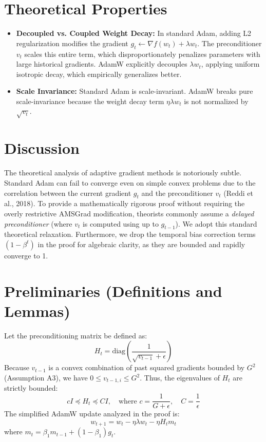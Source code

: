 \documentclass[11pt]{article}
\begin{document}
\section*{Theoretical Properties}
\begin{itemize}
    \item \textbf{Decoupled vs. Coupled Weight Decay:} In standard Adam, adding L2 regularization modifies the gradient $g_t \gets \nabla f(w_t) + \lambda w_t$. The preconditioner $v_t$ scales this entire term, which disproportionately penalizes parameters with large historical gradients. AdamW explicitly decouples $\lambda w_t$, applying uniform isotropic decay, which empirically generalizes better.
    \item \textbf{Scale Invariance:} Standard Adam is scale-invariant. AdamW breaks pure scale-invariance because the weight decay term $\eta \lambda w_t$ is not normalized by $\sqrt{v_t}$.
\end{itemize}

\section*{Discussion}
The theoretical analysis of adaptive gradient methods is notoriously subtle. Standard Adam can fail to converge even on simple convex problems due to the correlation between the current gradient $g_t$ and the preconditioner $v_t$ (Reddi et al., 2018). To provide a mathematically rigorous proof without requiring the overly restrictive AMSGrad modification, theorists commonly assume a \emph{delayed preconditioner} (where $v_t$ is computed using up to $g_{t-1}$). We adopt this standard theoretical relaxation. Furthermore, we drop the temporal bias correction terms $(1-\beta^t)$ in the proof for algebraic clarity, as they are bounded and rapidly converge to 1.

\section*{Preliminaries (Definitions and Lemmas)}
Let the preconditioning matrix be defined as:
\begin{equation}
    H_t = \text{diag}\left(\frac{1}{\sqrt{v_{t-1}} + \epsilon}\right)
\end{equation}
Because $v_{t-1}$ is a convex combination of past squared gradients bounded by $G^2$ (Assumption A3), we have $0 \leq v_{t-1, i} \leq G^2$. Thus, the eigenvalues of $H_t$ are strictly bounded:
\begin{equation}
    c I \preceq H_t \preceq C I, \quad \text{where } c = \frac{1}{G + \epsilon}, \quad C = \frac{1}{\epsilon}
\end{equation}
The simplified AdamW update analyzed in the proof is:
\begin{equation}
    w_{t+1} = w_t - \eta \lambda w_t - \eta H_t m_t
\end{equation}
where $m_t = \beta_1 m_{t-1} + (1-\beta_1) g_t$. 
\end{document}

